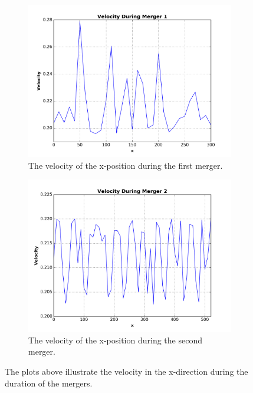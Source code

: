 \documentclass[12pt]{report}
\begin{document}
\begin{figure}[!htb]
\label{fig:density_of_systems}

\end{figure}


\begin{figure}[H]
\centering 
    \begin{subfigure}[b]{.475\textwidth}
        \centering
        \includegraphics[width=\linewidth]{velocity_merger1.png}
        \caption[]%
        {{The velocity of the x-position during the first merger.}}
    
        \label{fig:velcoity_merger1}
    \end{subfigure} %
    \hfill
    \begin{subfigure}[b]{.475\textwidth}
        \centering
        \includegraphics[width=\linewidth]{velocity_merger2.png}
        \caption[]%
        {{The velocity of the x-position during the second merger.}}
        \label{fig:velocity_merger2}
    \end{subfigure} %
    \caption[]
        {The plots above illustrate the velocity in the x-direction during the duration of the mergers.} 
        \label{fig:velocity_of_mergers}
\end{figure}
\end{document}
